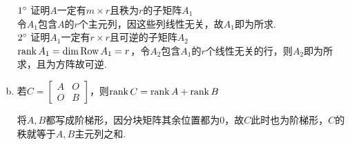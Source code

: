 \begin{theorem}[秩的进阶定理]
\begin{enumerate}[(a)]
	\begin{analysis}
	$1\degree$ 证明$A$一定有$m\times r$且秩为$r$的子矩阵$A_1$\\
	令$A_1$包含$A$的$r$个主元列，因这些列线性无关，故$A_1$即为所求.\\
	$2\degree$ 证明$A_1$一定有$r\times r$且可逆的子矩阵$A_2$\\
	$\mathrm{rank}\, A_1=\mathrm{dim}\,\mathrm{Row}\, A_1=r$，令$A_2$包含$A_1$的$r$个线性无关的行，则$A_2$即为所求，且为方阵故可逆.
	\end{analysis}
	\item 若$C=\begin{bmatrix}A&O\\O&B\end{bmatrix}$，则$\mathrm{rank}\, C=\mathrm{rank}\, A+\mathrm{rank}\, B$
	\begin{analysis}
	将$A,B$都写成阶梯形，因分块矩阵其余位置都为$0$，故$C$此时也为阶梯形，$C$的秩就等于$A,B$主元列之和.
	\end{analysis}
\end{enumerate}
\end{theorem}

